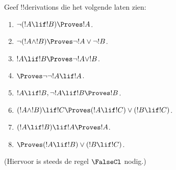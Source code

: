 \documentclass[openany]{memoir}
\begin{document}
\begin{prob}
Geef !!{derivation}s die het volgende laten zien:
\begin{enumerate}
\item $\lnot(!A \lif !B) \Proves !A$.
\item $\lnot(!A \land !B) \Proves \lnot !A \lor \lnot !B$.
\item $!A \lif !B \Proves \lnot !A \lor !B$.
\item $\Proves \lnot \lnot !A \lif !A$.
\item $!A \lif !B, \lnot !A \lif !B \Proves !B$.
\item $(!A \land !B) \lif !C \Proves (!A \lif !C) \lor (!B \lif !C)$.
\item $(!A \lif !B) \lif !A \Proves !A$.
\item $\Proves (!A \lif !B) \lor (!B \lif !C)$.
\end{enumerate}
(Hiervoor is steeds de regel $\FalseCl$ nodig.)
\end{prob}
\endgroup

\begingroup
\def\olfilename{OLP-0090}
\def\olfilepath{content/first-order-logic/natural-deduction/}
\hypertarget{unit-OLP-0090}{}




\end{document}
